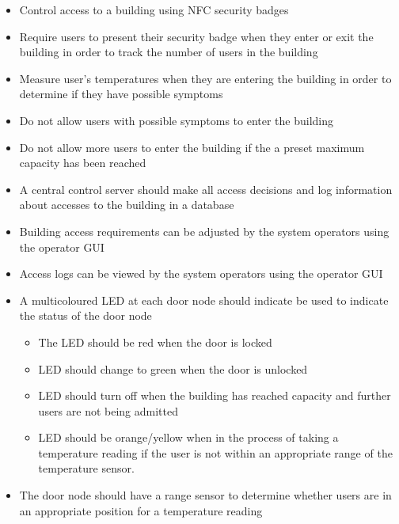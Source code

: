 \begin{itemize}
    \item Control access to a building using NFC security badges
    \item Require users to present their security badge when they enter or exit
          the building in order to track the number of users in the building
    \item Measure user's temperatures when they are entering the building in
          order to determine if they have possible symptoms
    \item Do not allow users with possible symptoms to enter the building
    \item Do not allow more users to enter the building if the a preset maximum
          capacity has been reached
    \item A central control server should make all access decisions and log
          information about accesses to the building in a database
    \item Building access requirements can be adjusted by the system operators
          using the operator GUI
    \item Access logs can be viewed by the system operators
          using the operator GUI
    \item A multicoloured LED at each door node should indicate be used to
          indicate the status of the door node
    \begin{itemize}
        \item The LED should be red when the door is locked
        \item LED should change to green when the door is unlocked
        \item LED should turn off when the building has reached capacity and
              further users are not being admitted
        \item LED should be orange/yellow when in the process of taking a temperature
              reading if the user is not within an appropriate range of the
              temperature sensor.
    \end{itemize}
    \item The door node should have a range sensor to determine whether users
          are in an appropriate position for a temperature reading
\end{itemize}
